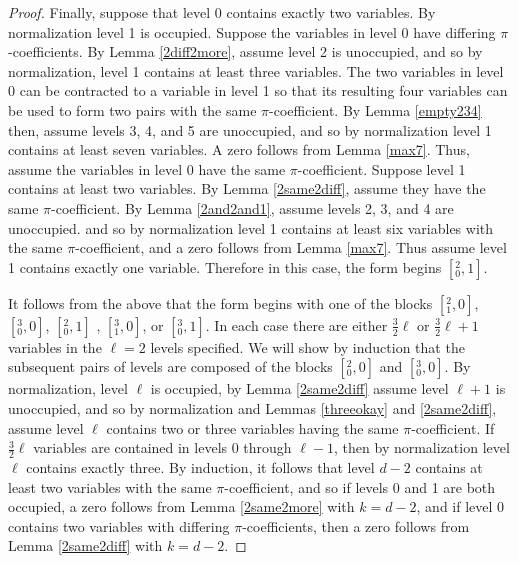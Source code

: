 \documentclass[12pt]{amsart}
\newtheorem{lemma}{Lemma}
\begin{document}
\begin{proof}

Finally, suppose that level 0 contains exactly two variables. By normalization level 1 is occupied.  Suppose the variables in level 0 have differing $\pi$-coefficients.  By Lemma \ref{2diff2more}, assume level 2 is unoccupied, and so by normalization, level 1 contains at least three variables.  The two variables in level 0 can be contracted to a variable in level 1 so that its resulting four variables can be used to form two pairs with the same $\pi$-coefficient.  By Lemma \ref{empty234} then, assume levels 3, 4, and 5 are unoccupied, and so by normalization level 1 contains at least seven variables.  A zero follows from Lemma \ref{max7}.  Thus, assume the variables in level 0 have the same $\pi$-coefficient.  Suppose level 1 contains at least two variables.  By Lemma \ref{2same2diff}, assume they have the same $\pi$-coefficient.  By Lemma \ref{2and2and1}, assume levels 2, 3, and 4 are unoccupied. and so by normalization level 1 contains at least six variables with the same $\pi$-coefficient, and a zero follows from Lemma \ref{max7}.  Thus assume level 1 contains exactly one variable.  Therefore in this case, the form begins $[{}^2_0,1]$.


It follows from the above that the form begins with one of the blocks $[{}^{2}_{1}, 0]$, $[{}^{3}_{0}, 0]$, $[{}^{2}_{0}, 1]$ , $[{}^{3}_{1},0]$, or $[{}^{3}_{0}, 1]$.  In each case there are either $\frac{3}{2}\ell$ or  $\frac{3}{2} \ell + 1$ variables in the $\ell = 2$ levels specified.  We will show by induction that the subsequent pairs of levels are composed of the blocks $[{}^2_0,0]$ and $[{}^3_0,0]$.  By normalization, level $\ell$ is occupied, by Lemma \ref{2same2diff} assume level $\ell + 1$ is unoccupied, and so by normalization and Lemmas \ref{threeokay} and \ref{2same2diff}, assume level $\ell$ contains two or three variables having the same $\pi$-coefficient.  If $\frac{3}{2}\ell$ variables are contained in levels 0 through $\ell - 1$, then by normalization level $\ell$ contains exactly three.  By induction, it follows that level $d-2$ contains at least two variables with the same $\pi$-coefficient, and so if levels 0 and 1 are both occupied, a zero follows from Lemma \ref{2same2more} with $k=d-2$, and if level 0 contains two variables with differing $\pi$-coefficients, then a zero follows from Lemma \ref{2same2diff} with $k=d-2$.


\end{proof}
\end{document}
